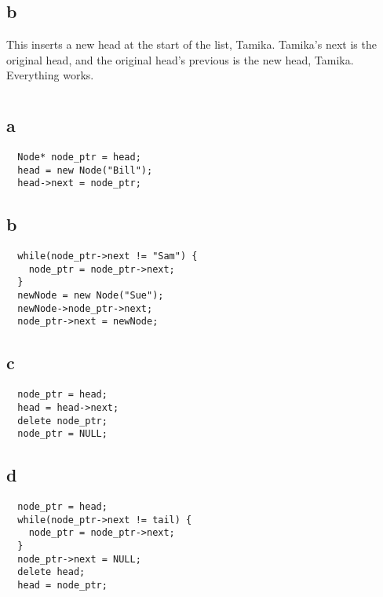 \documentclass[12pt]{article}
\begin{document}
\subsection*{b}
This inserts a new head at the start of the list, Tamika. Tamika's next is the original head, and the original head's previous is the new head, Tamika. Everything works.
\section{}
\subsection*{a}
\begin{verbatim}
  Node* node_ptr = head;
  head = new Node("Bill");
  head->next = node_ptr;
\end{verbatim}
\subsection*{b}
\begin{verbatim}
  while(node_ptr->next != "Sam") {
    node_ptr = node_ptr->next;
  }
  newNode = new Node("Sue");
  newNode->node_ptr->next;
  node_ptr->next = newNode;
\end{verbatim}
\subsection*{c}
\begin{verbatim}
  node_ptr = head;
  head = head->next;
  delete node_ptr;
  node_ptr = NULL;
\end{verbatim}
\subsection*{d}
\begin{verbatim}
  node_ptr = head;
  while(node_ptr->next != tail) {
    node_ptr = node_ptr->next;
  }
  node_ptr->next = NULL;
  delete head;
  head = node_ptr;
\end{verbatim}
\end{document}
